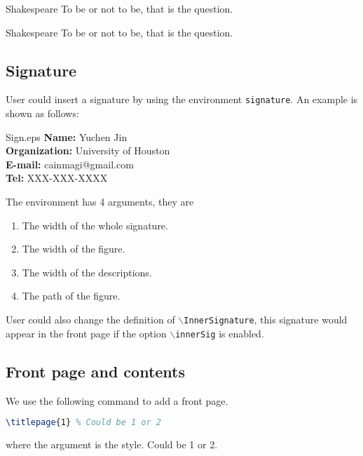 \begin{multicols}{2}
\begin{shadeQuote}{Shakespeare}
  To be or not to be, that is the question.
\end{shadeQuote}

\begin{shadeQuote}[r]{Shakespeare}
  To be or not to be, that is the question.
\end{shadeQuote}

\subsection{Signature}

User could insert a signature by using the environment \texttt{signature}. An example is shown as follows:

\begin{signature}{0.9\columnwidth}{0.8in}{12em}{Sign.eps}
  \textbf{Name:} Yuchen Jin \\
  \textbf{Organization:} University of Houston \\
  \textbf{E-mail:} cainmagi@gmail.com \\
  \textbf{Tel:} XXX-XXX-XXXX \\
\end{signature}

The environment has 4 arguments, they are

\begin{enumerate}[(1)]
  \item The width of the whole signature.
  \item The width of the figure.
  \item The width of the descriptions.
  \item The path of the figure.
\end{enumerate}

User could also change the definition of \texttt{$\backslash$InnerSignature}, this signature would appear in the front page if the option \texttt{$\backslash$innerSig} is enabled.

\subsection{Front page and contents}

We use the following command to add a front page.
\begin{lstlisting}[language=tex]
\titlepage{1} % Could be 1 or 2
\end{lstlisting}
where the argument is the style. Could be 1 or 2.


\end{multicols}
